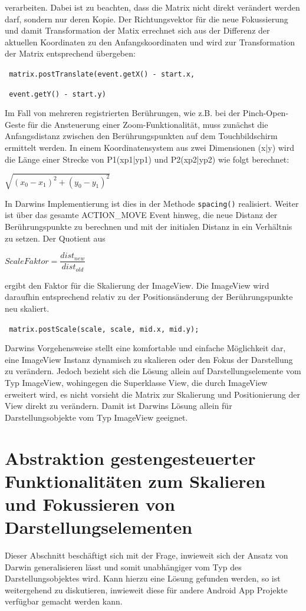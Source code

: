 \documentclass[12pt,oneside,a4paper,bibtotoc,liststotoc]{scrreprt}
\begin{document}
verarbeiten. Dabei ist zu beachten, dass die Matrix nicht direkt verändert werden darf, sondern nur deren Kopie. Der Richtungsvektor für die neue Fokussierung und damit Transformation der Matix errechnet sich aus der Differenz der aktuellen Koordinaten zu den Anfangskoordinaten und wird zur Transformation der Matrix entsprechend übergeben:\newline
\centerline{ \texttt{ matrix.postTranslate(event.getX() - start.x,}} \newline \centerline{ \texttt{ event.getY() - start.y) }}\newline \newline
Im Fall von mehreren registrierten Berührungen, wie z.B. bei der Pinch-Open-Geste für die Ansteuerung einer Zoom-Funktionalität, muss zunächst die Anfangsdistanz zwischen den Berührungspunkten auf dem Touchbildschirm ermittelt werden. In einem Koordinatensystem aus zwei Dimensionen (x|y) wird die Länge einer Strecke von P1(xp1|yp1) und P2(xp2|yp2) wie folgt berechnet:
\centerline{$\sqrt{(x_{0}-x_{1})^{2}+(y_{0}-y_{1})^{2}}$ }\newline\newline
In Darwins Implementierung ist dies in der Methode \texttt{spacing()} realisiert. Weiter ist über das gesamte ACTION\_MOVE Event hinweg, die neue Distanz der Berührungspunkte zu berechnen und mit der initialen Distanz in ein Verhältnis zu setzen. Der Quotient aus
\centerline{$ ScaleFaktor = \dfrac{dist_{new}}{dist_{old}}$} \newline\newline
ergibt den Faktor für die Skalierung der ImageView. Die ImageView wird daraufhin entsprechend relativ zu der Positionsänderung der Berührungspunkte neu skaliert.\newline
\centerline{ \texttt{ matrix.postScale(scale, scale, mid.x, mid.y);}} \newline\newline
Darwins Vorgehensweise stellt eine komfortable und einfache Möglichkeit dar, eine ImageView Instanz dynamisch zu skalieren oder den Fokus der Darstellung zu verändern. Jedoch bezieht sich die Lösung allein auf Darstellungselemente vom Typ ImageView, wohingegen die Superklasse View, die durch ImageView erweitert wird, es nicht vorsieht die Matrix zur Skalierung und Positionierung der View direkt zu verändern. Damit ist Darwins Lösung allein für Darstellungsobjekte vom Typ ImageView geeignet.

\section{Abstraktion gestengesteuerter Funktionalitäten zum Skalieren und Fokussieren von Darstellungselementen}
Dieser Abschnitt beschäftigt sich mit der Frage, inwieweit sich der Ansatz von Darwin generalisieren lässt und somit unabhängiger vom Typ des Darstellungsobjektes wird. Kann hierzu eine Lösung gefunden werden, so ist weitergehend zu diskutieren, inwieweit diese für andere Android App Projekte verfügbar gemacht werden kann.
\end{document}
